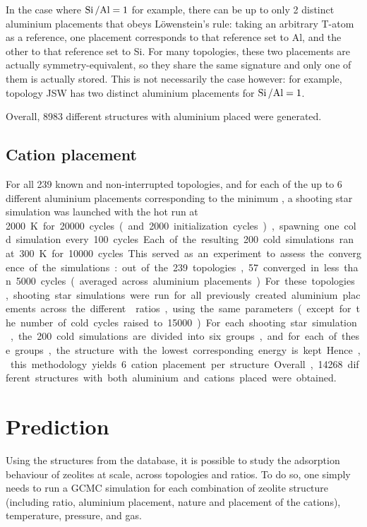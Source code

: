 \documentclass[main.tex]{subfiles}
\begin{document}
In the case where $\mbox{Si\,/Al} = 1$ for example, there can be up to only 2 distinct aluminium placements that obeys L\"owenstein's rule: taking an arbitrary T-atom as a reference, one placement corresponds to that reference set to Al, and the other to that reference set to Si. For many topologies, these two placements are actually symmetry-equivalent, so they share the same signature and only one of them is actually stored. This is not necessarily the case however: for example, topology JSW has two distinct aluminium placements for $\mbox{Si\,/Al} = 1$.

Overall, \num{8983} different structures with aluminium placed were generated.

\subsection{Cation placement}

For all 239 known and non-interrupted topologies, and for each of the up to 6 different aluminium placements corresponding to the minimum \SiAl, a shooting star simulation was launched with the hot run at \qty{2000}K for \num{20000} cycles (and \num{2000} initialization cycles), spawning one cold simulation every \num{100} cycles. Each of the resulting \num{200} cold simulations ran at \qty{300}K for \num{10000} cycles. This served as an experiment to assess the convergence of the simulations: out of the 239 topologies, 57 converged in less than \num{5000} cycles (averaged across aluminium placements). For these topologies, shooting star simulations were run for all previously created aluminium placements across the different \SiAl ratios, using the same parameters (except for the number of cold cycles raised to \num{15000}). For each shooting star simulation, the \num{200} cold simulations are divided into six groups, and for each of these groups, the structure with the lowest corresponding energy is kept. Hence, this methodology yields 6 cation placement per structure.


Overall, \num{14268} different structures with both aluminium and cations placed were obtained.


\section{Prediction}

Using the structures from the database, it is possible to study the adsorption behaviour of zeolites at scale, across topologies and \SiAl ratios. To do so, one simply needs to run a GCMC simulation for each combination of zeolite structure (including \SiAl ratio, aluminium placement, nature and placement of the cations), temperature, pressure, and gas.
\end{document}
